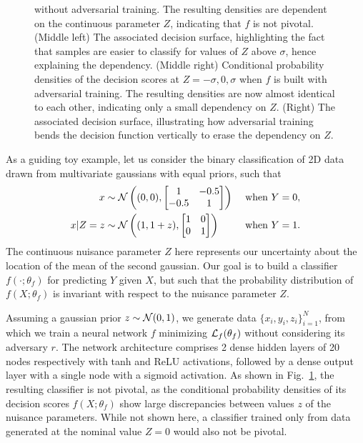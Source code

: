 \documentclass{article}
\theoremstyle{plain}
\begin{document}
\begin{figure}
{        without adversarial training. The resulting densities
       are dependent on the continuous parameter $Z$, indicating that $f$ is not pivotal.
    (Middle left) The associated decision surface, highlighting
       the fact that samples are easier to classify for values of $Z$ above $\sigma$,
       hence explaining the dependency.
    (Middle right) Conditional probability densities of the decision scores at $Z=-\sigma, 0, \sigma$ when $f$ is
       built with adversarial training.
       The resulting densities are now almost identical to each other, indicating only a
       small dependency on $Z$.
    (Right) The associated decision surface, illustrating how adversarial
       training bends the decision function vertically to erase the dependency on $Z$.
    }
    \label{fig:toy}
\end{figure}

As a guiding toy example, let us consider the binary classification of 2D
data drawn from multivariate gaussians with equal priors, such that
\begin{align}
    x &\sim {\cal N}\left ((0,0), \begin{bmatrix}
                              1 & -0.5 \\
                              -0.5 & 1
                            \end{bmatrix}\right) &\text{ when } Y=0, \\
    x|Z=z &\sim {\cal N}\left ((1,1+z),  \begin{bmatrix}
                              1 & 0 \\
                              0 & 1
                             \end{bmatrix}\right) &\text{ when } Y=1.
\end{align}
The continuous nuisance parameter $Z$ here represents our
uncertainty about the location of the mean of the second gaussian. Our goal is to
build a classifier $f(\cdot;\theta_f)$ for predicting $Y$ given $X$, but such that
the probability distribution of $f(X;\theta_f)$ is invariant with respect to the
nuisance parameter $Z$.

Assuming a gaussian prior $z \sim {\cal N}(0,1)$, we generate
data $\{ x_i, y_i, z_i \}_{i=1}^N$, from which we train a neural
network  $f$ minimizing ${\cal L}_f(\theta_f)$ without considering its
adversary $r$. The network architecture comprises 2 dense hidden layers of 20
nodes respectively with tanh and ReLU activations, followed  by a dense output layer with a single
node with a sigmoid activation. As shown in Fig.~\ref{fig:toy}, the resulting
classifier is not pivotal, as the conditional probability densities of its
decision scores $f(X;\theta_f)$ show large discrepancies between values $z$ of
the nuisance parameters. While not shown here, a classifier trained only from data
generated at the nominal value $Z=0$ would also not be pivotal.
\end{document}
